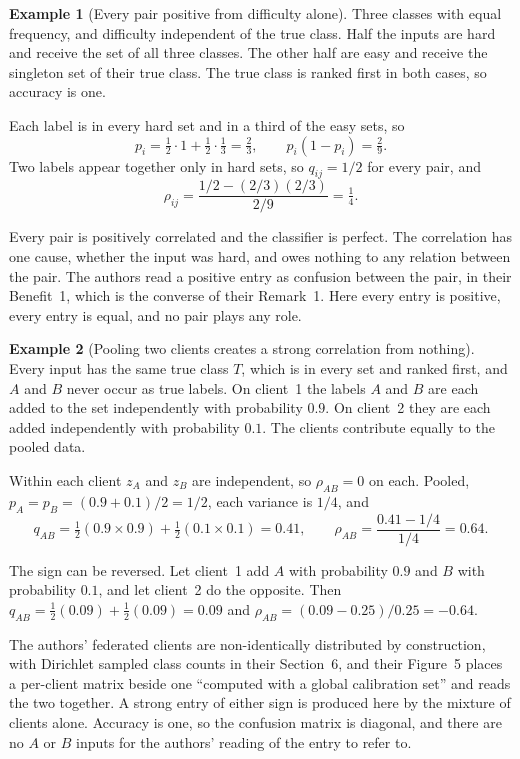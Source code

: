 \documentclass[11pt]{article}
\theoremstyle{definition}
\newtheorem{example}{Example}
\theoremstyle{definition}
\theoremstyle{remark}
\begin{document}
\begin{example}[Every pair positive from difficulty alone]\label{ex:hard}
Three classes with equal frequency, and difficulty independent of the true class. Half the inputs
are hard and receive the set of all three classes. The other half are easy and receive the singleton
set of their true class. The true class is ranked first in both cases, so accuracy is one.

Each label is in every hard set and in a third of the easy sets, so
\[
p_i = \tfrac12 \cdot 1 + \tfrac12 \cdot \tfrac13 = \tfrac23, \qquad p_i(1-p_i) = \tfrac29 .
\]
Two labels appear together only in hard sets, so $q_{ij} = 1/2$ for every pair, and
\[
\rho_{ij} = \frac{1/2 - (2/3)(2/3)}{2/9} = \tfrac14 .
\]

Every pair is positively correlated and the classifier is perfect. The correlation has one cause, whether the input was hard, and owes nothing to any relation between
the pair. The authors read a positive entry as confusion between the pair, in their Benefit~1, which
is the converse of their Remark~1. Here every entry is positive, every entry is equal, and no pair
plays any role.
\end{example}

\begin{example}[Pooling two clients creates a strong correlation from nothing]\label{ex:pool}
Every input has the same true class $T$, which is in every set and ranked first, and $A$ and $B$
never occur as true labels. On client~1 the labels $A$ and $B$ are each added to the set
independently with probability $0.9$. On client~2 they are each added independently
with probability $0.1$. The clients contribute equally to the pooled data.

Within each client $z_A$ and $z_B$ are independent, so $\rho_{AB} = 0$ on each. Pooled,
$p_A = p_B = (0.9 + 0.1)/2 = 1/2$, each variance is $1/4$, and
\[
q_{AB} = \tfrac12 (0.9 \times 0.9) + \tfrac12 (0.1 \times 0.1) = 0.41, \qquad
\rho_{AB} = \frac{0.41 - 1/4}{1/4} = 0.64 .
\]

The sign can be reversed. Let client~1 add $A$ with probability $0.9$ and $B$ with probability
$0.1$, and let client~2 do the opposite. Then $q_{AB} = \tfrac12(0.09) + \tfrac12(0.09) = 0.09$ and
$\rho_{AB} = (0.09 - 0.25)/0.25 = -0.64$.

The authors' federated clients are non-identically distributed by construction, with Dirichlet
sampled class counts in their Section~6, and their Figure~5 places a per-client matrix beside one
``computed with a global calibration set'' and reads the two together. A strong entry of either
sign is produced here by the mixture of clients alone. Accuracy is one, so the confusion matrix is
diagonal, and there are no $A$ or $B$ inputs for the authors' reading of the entry to refer to.
\end{example}
\end{document}
